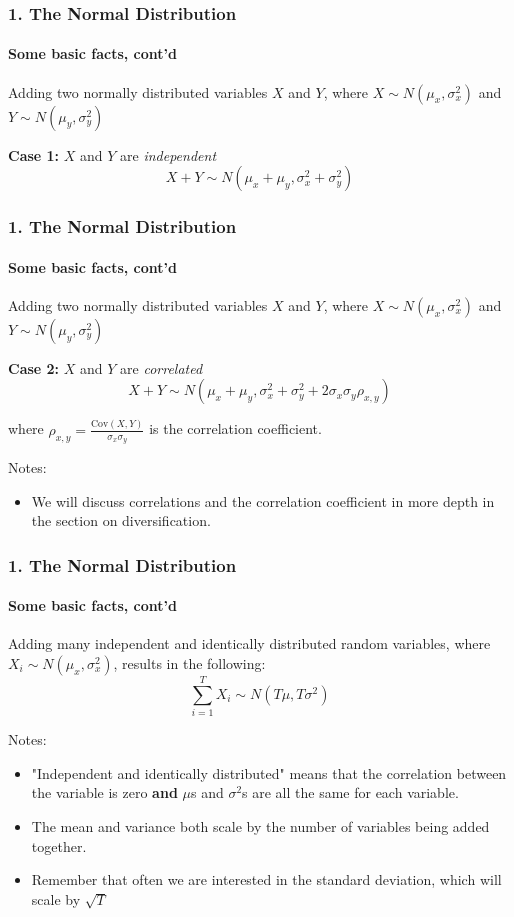 \documentclass{beamer}
\begin{document}
\begin{foundframe}[t]
    \frametitle{1. The Normal Distribution}
    \framesubtitle{Some basic facts, cont'd}

    Adding two normally distributed variables $X$ and $Y$, where $X \sim N(\mu_x,\sigma_x^2)$ and $Y \sim N(\mu_y,\sigma_y^2)$ \\
    \vspace{1em}
    
    \textbf{Case 1:} $X$ and $Y$ are \textit{independent}
    $$X + Y \sim N(\mu_x+\mu_y,\sigma_x^2 + \sigma_y^2)$$

\end{foundframe}

\begin{foundframe}[t]
    \frametitle{1. The Normal Distribution}
    \framesubtitle{Some basic facts, cont'd}

    Adding two normally distributed variables $X$ and $Y$, where $X \sim N(\mu_x,\sigma_x^2)$ and $Y \sim N(\mu_y,\sigma_y^2)$\\
    \vspace{1em}
     
    \textbf{Case 2:} $X$ and $Y$ are \textit{correlated} 
    $$X + Y \sim N(\mu_x+\mu_y,\sigma_x^2 + \sigma_y^2 + 2\sigma_x\sigma_y\rho_{x,y})$$
    
    where $\rho_{x,y} = \frac{\text{Cov}(X,Y)}{\sigma_x\sigma_y}$ is the correlation coefficient.\\
    \vspace{1em}

    Notes:
    \begin{itemize}
    \item We will discuss correlations and the correlation coefficient in more depth in the section on diversification.
    \end{itemize}

\end{foundframe}

\begin{foundframe}[t]
    \frametitle{1. The Normal Distribution}
    \framesubtitle{Some basic facts, cont'd}
    
    Adding many independent and identically distributed random variables, where $X_i \sim N(\mu_x,\sigma_x^2)$, results in the following:
    $$\sum_{i=1}^{T}X_i \sim N(T\mu,T\sigma^2)$$

    Notes:
    \begin{itemize}
    \item "Independent and identically distributed" means that the correlation between the variable is zero \textbf{and} $\mu$s and $\sigma^2$s are all the same for each variable.
    \item The mean and variance both scale by the number of variables being added together.
    \item Remember that often we are interested in the standard deviation, which will scale by $\sqrt{T}$
    \end{itemize}
  
\end{foundframe}
\end{document}
